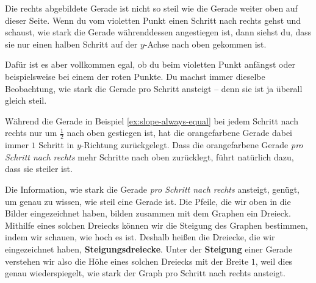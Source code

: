 \documentclass[../../main.tex]{subfiles}
\begin{document}
\begin{example}{}
    Die rechts abgebildete Gerade ist nicht so steil wie die Gerade weiter oben auf dieser Seite. Wenn du vom violetten Punkt einen Schritt nach rechts gehst und schaust, wie stark die Gerade währenddessen angestiegen ist, dann siehst du, dass sie nur einen halben Schritt auf der $y$-Achse nach oben gekommen ist.
    
    Dafür ist es aber vollkommen egal, ob du beim violetten Punkt anfängst oder beispielsweise bei einem der roten Punkte. Du machst immer dieselbe Beobachtung, wie stark die Gerade pro Schritt ansteigt -- denn sie ist ja überall gleich steil.
\end{example}

Während die Gerade in Beispiel \ref{ex:slope-always-equal} bei jedem Schritt nach rechts nur um $\frac{1}{2}$ nach oben gestiegen ist, hat die orangefarbene Gerade dabei immer $1$ Schritt in $y$-Richtung zurückgelegt. Dass die orangefarbene Gerade \emph{pro Schritt nach rechts} mehr Schritte nach oben zurücklegt, führt natürlich dazu, dass sie steiler ist.

Die Information, wie stark die Gerade \emph{pro Schritt nach rechts} ansteigt, genügt, um genau zu wissen, wie steil eine Gerade ist. Die Pfeile, die wir oben in die Bilder eingezeichnet haben, bilden zusammen mit dem Graphen ein Dreieck. Mithilfe eines solchen Dreiecks können wir die Steigung des Graphen bestimmen, indem wir schauen, wie hoch es ist. Deshalb heißen die Dreiecke, die wir eingezeichnet haben, \textbf{Steigungsdreiecke}. Unter der \textbf{Steigung} einer Gerade verstehen wir also die Höhe eines solchen Dreiecks mit der Breite $1$, weil dies genau wiederspiegelt, wie stark der Graph pro Schritt nach rechts ansteigt.
\end{document}
